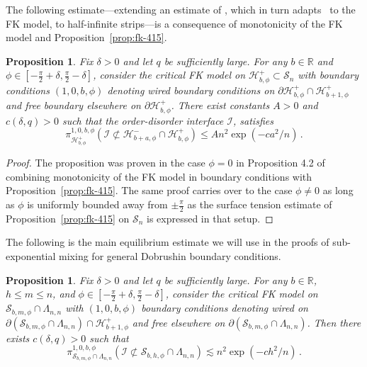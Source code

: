 \documentclass[reqno,11pt]{amsart}
\numberwithin{equation}{section}
\newtheorem{proposition}[theorem]{Proposition}
\theoremstyle{definition}{
\newtheorem{example}[theorem]{Example}
\newtheorem{definition}[theorem]{Definition}
\newtheorem*{definition*}{Definition}
\newtheorem{problem}[theorem]{Problem}
\newtheorem{question}[theorem]{Question}
\newtheorem{remark}[theorem]{Remark}
}
\newcommand{\cS}{\ensuremath{\mathcal S}}
\begin{document}
The following estimate---extending an estimate of \cite{MMRS91}, which in turn adapts~\cite{DKS} to the FK model, to half-infinite strips---is a consequence of monotonicity of the FK model and Proposition~\ref{prop:fk-415}. 

\begin{proposition}\label{prop:surface-tension}
Fix  $\delta>0$ and let $q$ be sufficiently large. For any $b\in \mathbb R$ and $\phi\in [-\frac \pi 2 +\delta,\frac \pi 2 -\delta]$,  consider the critical FK model on $\mathcal H^+_{b,\phi}\subset \mathcal S_n$ with boundary conditions $(1,0,b,\phi)$ denoting wired boundary conditions on $\partial \mathcal H^+_{b,\phi} \cap \mathcal H^+_{b+1,\phi}$  and free boundary elsewhere on $\partial \mathcal H^+_{b,\phi}$. There exist constants $A>0$ and $c(\delta,q)>0$ such that the order-disorder interface $\mathcal I$, satisfies
\[\pi^{1,0,b,\phi}_{\mathcal H^+_{b,\phi}} (\mathcal I\not\subset \mathcal H_{b+a,\phi}^- \cap \mathcal H^+_{b,\phi})\leq A n^2\exp\left(-c a^2 / n\right)\,.
\]
\end{proposition}

\begin{proof}The proposition was proven in the case $\phi=0$ in Proposition 4.2 of \cite{GL16a} combining monotonicity of the FK model in boundary conditions with Proposition~\ref{prop:fk-415}.  The same proof carries over to the case $\phi\neq 0$ as long as $\phi$ is uniformly bounded away from $\pm \frac \pi 2$ as the surface tension estimate of Proposition~\ref{prop:fk-415} on $\mathcal S_n$ is expressed in that setup.
\end{proof}


The following is the main equilibrium estimate we will use in the proofs of sub-exponential mixing for general Dobrushin boundary conditions. 

\begin{proposition}\label{prop:strip-surface-tension}
Fix  $\delta>0$ and let $q$ be sufficiently large. For any $b\in \mathbb R$, $h\leq m\leq n$, and $\phi\in [-\frac \pi 2+\delta,\frac \pi 2 -\delta]$, consider the critical FK model on $\mathcal S_{b,m,\phi}\cap \Lambda_{n,n}$ with $(1,0,b,\phi)$ boundary conditions denoting wired on $\partial (\mathcal S_{b,m,\phi} \cap \Lambda_{n,n})\cap \mathcal H^+_{b+1,\phi}$ and free elsewhere on $\partial (\cS_{b,m,\phi}\cap \Lambda_{n,n})$. Then there exists $c(\delta,q)>0$ such that
\[\pi_{\cS_{b,m,\phi}\cap \Lambda_{n,n}}^{1,0,b,\phi}(\mathcal I \not \subset  \mathcal S_{b,h,\phi}\cap \Lambda_{n,n} )\lesssim n^2 \exp({-ch^2/n})\,.
\]
\end{proposition}
\end{document}
